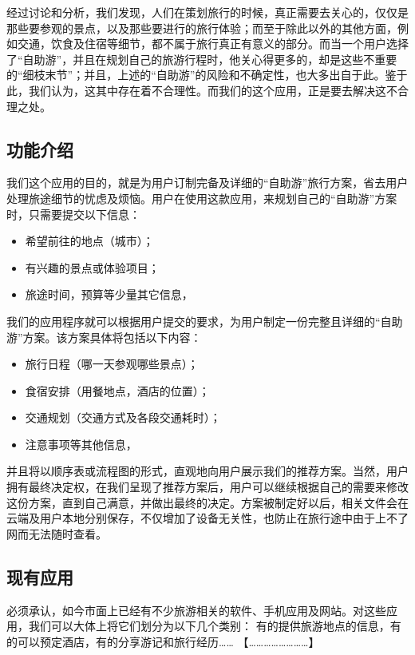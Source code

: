 \documentclass[12pt,a4paper]{article}
\begin{document}
\begin{CJK}{UTF8}{gbsn}
	经过讨论和分析，我们发现，人们在策划旅行的时候，真正需要去关心的，仅仅是那些要参观的景点，以及那些要进行的旅行体验；而至于除此以外的其他方面，例如交通，饮食及住宿等细节\footnotemark，都不属于旅行真正有意义的部分。而当一个用户选择了“自助游”，并且在规划自己的旅游行程时，他关心得更多的，却是这些不重要的“细枝末节”；并且，上述的“自助游”的风险和不确定性，也大多出自于此。鉴于此，我们认为，这其中存在着不合理性。而我们的这个应用，正是要去解决这不合理之处。


	\subsection{功能介绍}
	我们这个应用的目的，就是为用户订制完备及详细的“自助游”旅行方案，省去用户处理旅途细节的忧虑及烦恼。用户在使用这款应用，来规划自己的“自助游”方案时，只需要提交以下信息：
	\begin{itemize}
	\item 希望前往的地点（城市）；
	\item 有兴趣的景点或体验项目；
	\item 旅途时间，预算等少量其它信息，
	\end{itemize}
	我们的应用程序就可以根据用户提交的要求，为用户制定一份完整且详细的“自助游”方案。该方案具体将包括以下内容：
	\begin{itemize}
	\item 旅行日程（哪一天参观哪些景点）；
	\item 食宿安排（用餐地点，酒店的位置）；
	\item 交通规划（交通方式及各段交通耗时）；
	\item 注意事项等其他信息，
	\end{itemize}
	并且将以顺序表或流程图的形式，直观地向用户展示我们的推荐方案。当然，用户拥有最终决定权，在我们呈现了推荐方案后，用户可以继续根据自己的需要来修改这份方案，直到自己满意，并做出最终的决定。方案被制定好以后，相关文件会在云端及用户本地分别保存，不仅增加了设备无关性，也防止在旅行途中由于上不了网而无法随时查看。
	
	\subsection{现有应用}
	必须承认，如今市面上已经有不少旅游相关的软件、手机应用及网站。对这些应用，我们可以大体上将它们划分为以下几个类别：
	有的提供旅游地点的信息，有的可以预定酒店，有的分享游记和旅行经历……
	{\color{red} 【……………………】}


\end{CJK}
\end{document}
